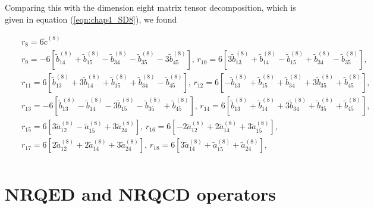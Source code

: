 Comparing this with the dimension eight matrix tensor decomposition, which is given in equation (\ref{eqn:chap4_SD8}), we found

\begin{eqnarray}
&&r_8=6\tilde{c}^{(8)}\nonumber\\
&&r_9=-6\left[\tilde{b}_{14}^{(8)}+\tilde{b}_{15}^{(8)}-\tilde{b}_{34}^{(8)}-\tilde{b}_{35}^{(8)}-3\tilde{b}_{45}^{(8)}\right],\,
r_{10}=6\left[3\tilde{b}_{13}^{(8)}+\tilde{b}_{14}^{(8)}-\tilde{b}_{15}^{(8)}+\tilde{b}_{34}^{(8)}-\tilde{b}_{35}^{(8)}\right],\,\nonumber\\
&&r_{11}=6\left[\tilde{b}_{13}^{(8)}+3\tilde{b}_{14}^{(8)}+\tilde{b}_{15}^{(8)}+\tilde{b}_{34}^{(8)}-\tilde{b}_{45}^{(8)}\right],\, 
r_{12}=6\left[-\tilde{b}_{13}^{(8)}+\tilde{b}_{15}^{(8)}+\tilde{b}_{34}^{(8)}+3\tilde{b}_{35}^{(8)}+\tilde{b}_{45}^{(8)}\right],\, \nonumber\\
&&r_{13}=-6\left[\tilde{b}_{13}^{(8)}-\tilde{b}_{14}^{(8)}-3\tilde{b}_{15}^{(8)}-\tilde{b}_{35}^{(8)}+\tilde{b}_{45}^{(8)}\right],\, 
r_{14}=6\left[\tilde{b}_{13}^{(8)}+\tilde{b}_{14}^{(8)}+3\tilde{b}_{34}^{(8)}+\tilde{b}_{35}^{(8)}+\tilde{b}_{45}^{(8)}\right],\, \nonumber\\
&&r_{15}=6\left[3\tilde{a}_{12}^{(8)}-\tilde{a}_{15}^{(8)}+3\tilde{a}_{24}^{(8)}\right],\, 
r_{16}=6\left[-2\tilde{a}_{12}^{(8)}+2\tilde{a}_{14}^{(8)}+3\tilde{a}_{15}^{(8)}\right],\, \nonumber\\
&&r_{17}=6\left[2\tilde{a}_{12}^{(8)}+2\tilde{a}_{14}^{(8)}+3\tilde{a}_{24}^{(8)}\right],\, 
r_{18}=6\left[3\tilde{a}_{14}^{(8)}+\tilde{a}_{15}^{(8)}+\tilde{a}_{24}^{(8)}\right],\, \nonumber\\
\end{eqnarray}
\section{NRQED and NRQCD operators}

